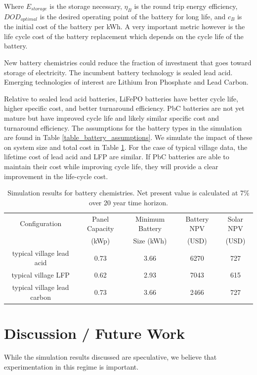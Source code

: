 \documentclass[conference]{IEEEtran}
\begin{document}
Where $E_{storage}$ is the storage necessary, $\eta_B$ is the
round trip energy efficiency, $DOD_{optimal}$ is the desired
operating point of the battery for long life, and $c_B$ is the
initial cost of the battery per kWh.
A very important metric however is the life cycle cost of the 
battery replacement which depends on the cycle life of the battery.

New battery chemistries could reduce the fraction of investment
that goes toward storage of electricity.
The incumbent battery technology is sealed lead acid.
Emerging technologies of interest are Lithium Iron Phosphate
and Lead Carbon.

Relative to sealed lead acid batteries, LiFePO batteries 
have better cycle life, higher specific cost, and better
turnaround efficiency.
PbC batteries are not yet mature but have improved cycle
life and likely similar specific cost and turnaround
efficiency.
The assumptions for the battery types in the simulation
are found in Table \ref{table_battery_assumptions}.
We simulate the impact of these on system size and total cost
in Table \ref{table_battery}.
For the case of typical village data, the lifetime cost of 
lead acid and LFP are similar.
If PbC batteries are able to maintain their cost while
improving cycle life, they will provide a clear improvement
in the life-cycle cost.


\begin{table}[!t]
\centering
\begin{tabular}{ c c c c c }
Configuration & Panel Capacity & Minimum Battery & Battery NPV & Solar NPV \\
              & (kWp)          & Size (kWh)      & (USD)       & (USD)     \\
\hline
typical village lead acid      & 0.73 & 3.66 & 6270 & 727 \\
typical village LFP            & 0.62 & 2.93 & 7043 & 615 \\
typical village lead carbon    & 0.73 & 3.66 & 2466 & 727 \\
\end{tabular}
\caption{Simulation results for battery chemistries.
Net present value is calculated at 7\% over 20 year 
time horizon.}
\label{table_battery}
\end{table}


\section{Discussion / Future Work}
While the simulation results discussed are speculative, 
we believe that experimentation in this regime is important.
\end{document}
